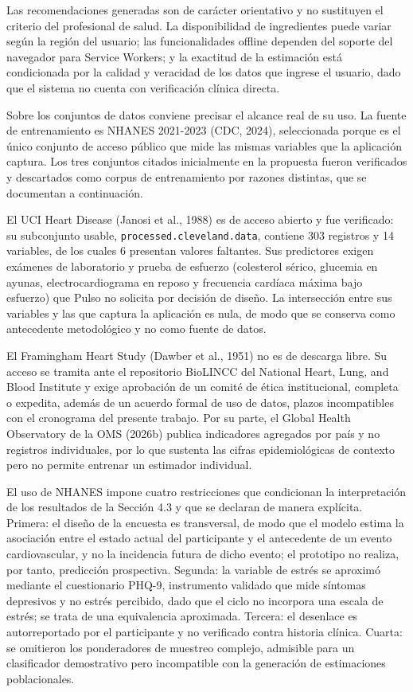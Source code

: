 \documentclass[12pt,letterpaper]{article}
\begin{document}
Las recomendaciones generadas son de carácter orientativo y no sustituyen el
criterio del profesional de salud. La disponibilidad de ingredientes puede variar
según la región del usuario; las funcionalidades offline dependen del soporte del
navegador para Service Workers; y la exactitud de la estimación está condicionada
por la calidad y veracidad de los datos que ingrese el usuario, dado que el
sistema no cuenta con verificación clínica directa.

Sobre los conjuntos de datos conviene precisar el alcance real de su uso. La
fuente de entrenamiento es NHANES 2021-2023 (CDC, 2024), seleccionada porque es
el único conjunto de acceso público que mide las mismas variables que la
aplicación captura. Los tres conjuntos citados inicialmente en la propuesta
fueron verificados y descartados como corpus de entrenamiento por razones
distintas, que se documentan a continuación.

El UCI Heart Disease (Janosi et al., 1988) es de acceso abierto y fue verificado:
su subconjunto usable, \texttt{processed.cleveland.data}, contiene 303 registros
y 14 variables, de los cuales 6 presentan valores faltantes. Sus predictores
exigen exámenes de laboratorio y prueba de esfuerzo (colesterol sérico, glucemia
en ayunas, electrocardiograma en reposo y frecuencia cardíaca máxima bajo
esfuerzo) que Pulso no solicita por decisión de diseño. La intersección entre sus
variables y las que captura la aplicación es nula, de modo que se conserva como
antecedente metodológico y no como fuente de datos.

El Framingham Heart Study (Dawber et al., 1951) no es de descarga libre. Su
acceso se tramita ante el repositorio BioLINCC del National Heart, Lung, and
Blood Institute y exige aprobación de un comité de ética institucional, completa
o expedita, además de un acuerdo formal de uso de datos, plazos incompatibles con
el cronograma del presente trabajo. Por su parte, el Global Health Observatory de
la OMS (2026b) publica indicadores agregados por país y no registros
individuales, por lo que sustenta las cifras epidemiológicas de contexto pero no
permite entrenar un estimador individual.

El uso de NHANES impone cuatro restricciones que condicionan la interpretación de
los resultados de la Sección 4.3 y que se declaran de manera explícita. Primera:
el diseño de la encuesta es transversal, de modo que el modelo estima la
asociación entre el estado actual del participante y el antecedente de un evento
cardiovascular, y no la incidencia futura de dicho evento; el prototipo no
realiza, por tanto, predicción prospectiva. Segunda: la variable de estrés se
aproximó mediante el cuestionario PHQ-9, instrumento validado que mide síntomas
depresivos y no estrés percibido, dado que el ciclo no incorpora una escala de
estrés; se trata de una equivalencia aproximada. Tercera: el desenlace es
autorreportado por el participante y no verificado contra historia clínica.
Cuarta: se omitieron los ponderadores de muestreo complejo, admisible para un
clasificador demostrativo pero incompatible con la generación de estimaciones
poblacionales.
\end{document}
